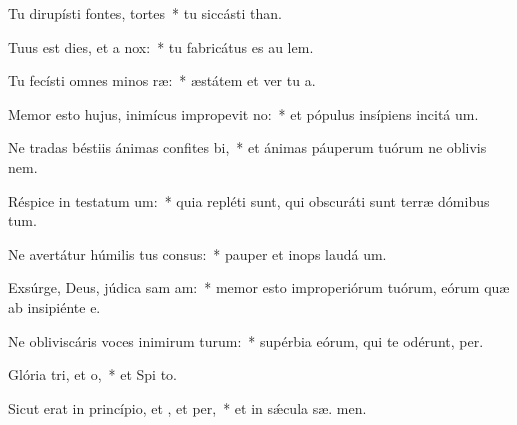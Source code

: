 \item Tu dirupísti fontes,  tortes~* tu siccásti  than.
\item Tuus est dies, et a  nox:~* tu fabricátus es au  lem.
\item Tu fecísti omnes minos ræ:~* æstátem et ver tu  a.
\item Memor esto hujus, inimícus impropevit no:~* et pópulus insípiens incitá  um.
\item Ne tradas béstiis ánimas confites bi,~* et ánimas páuperum tuórum ne oblivis  nem.
\item Réspice in testatum um:~* quia repléti sunt, qui obscuráti sunt terræ dómibus tum.
\item Ne avertátur húmilis tus consus:~* pauper et inops laudá  um.
\item Exsúrge, Deus, júdica sam am:~* memor esto improperiórum tuórum, eórum quæ ab insipiénte   e.
\item Ne obliviscáris voces inimirum turum:~* supérbia eórum, qui te odérunt,  per.
\item Glória tri, et o,~* et Spi to.
\item Sicut erat in princípio, et , et per,~* et in sǽcula sæ. men.
